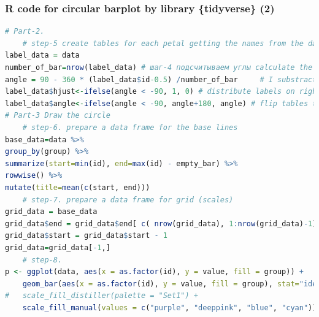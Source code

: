 \documentclass[pdflatex,compress,10pt,
	xcolor={dvipsnames,dvipsnames,svgnames,x11names,table},
	hyperref={colorlinks = true,breaklinks = true, urlcolor = NavyBlue, breaklinks = true}]{beamer}
\begin{document}
\begin{frame}[fragile]\frametitle{R code for circular barplot by library \{tidyverse\} (2)}
\begin{lstlisting}[language=R]
# Part-2. 
	# step-5 create tables for each petal getting the names from the data frame and the y position of each label
label_data = data 	
number_of_bar=nrow(label_data) # шаг-4 подсчитываем углы calculate the ANGLE of the labels 
angle = 90 - 360 * (label_data$id-0.5) /number_of_bar     # I substract 0.5 because the letter must have the angle of the center of the bars. Not extreme right(1) or extreme left (0)
label_data$hjust<-ifelse(angle < -90, 1, 0) # distribute labels on right and left 	
label_data$angle<-ifelse(angle < -90, angle+180, angle) # flip tables to make them readable 
# Part-3 Draw the circle 
	# step-6. prepare a data frame for the base lines
base_data=data %>% 
group_by(group) %>% 
summarize(start=min(id), end=max(id) - empty_bar) %>% 
rowwise() %>% 
mutate(title=mean(c(start, end)))
	# step-7. prepare a data frame for grid (scales)
grid_data = base_data
grid_data$end = grid_data$end[ c( nrow(grid_data), 1:nrow(grid_data)-1)] + 1
grid_data$start = grid_data$start - 1
grid_data=grid_data[-1,]	 
	# step-8. 
p <- ggplot(data, aes(x = as.factor(id), y = value, fill = group)) +
	geom_bar(aes(x = as.factor(id), y = value, fill = group), stat="identity", alpha=0.5) +	
#	scale_fill_distiller(palette = "Set1") +
  	scale_fill_manual(values = c("purple", "deeppink", "blue", "cyan")) +
\end{lstlisting}
\end{frame}
\end{document}
